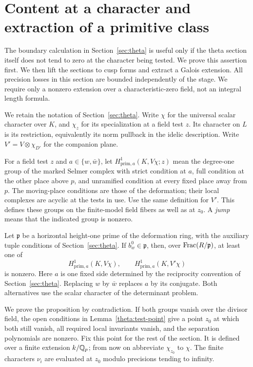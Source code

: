 \section{Content at a character and extraction of a primitive class}
\label{sec:extraction}

The boundary calculation in Section~\ref{sec:theta} is useful only if
the theta section itself does not tend to zero at the character being
tested.  We prove this assertion first.  We then lift the sections to
cusp forms and extract a Galois extension.  All precision losses in
this section are bounded independently of the stage.  We require only
a nonzero extension over a characteristic-zero field, not an integral
length formula.

We retain the notation of Section~\ref{sec:theta}.  Write $\chi$
for the universal scalar character over $K$, and $\chi_z$ for
its specialization at a field test $z$.  Its character on $L$
is its restriction, equivalently its norm pullback in the idelic
description.  Write $V'=V\otimes\chi_{D'}$ for the companion plane.

For a field test $z$ and $a\in\{w,\bar w\}$, let
$H^1_{\mathrm{prim},a}(K,V\chi;z)$ mean the degree-one group of the
marked Selmer complex with strict condition at $a$, full condition at
the other place above $p$, and unramified condition at every fixed
place away from $p$.  The moving-place conditions are those of the
deformation; their local complexes are acyclic at the tests in use.
Use the same definition for $V'$.  This defines these groups on the
finite-model field fibers as well as at $z_0$.  A \emph{jump} means
that the indicated group is nonzero.

\begin{proposition}
\label{extraction:theta-implication}
Let $\mathfrak p$ be a horizontal height-one prime of the deformation
ring, with the auxiliary tuple conditions of Section~\ref{sec:theta}.
If $b_w^0\in\mathfrak p$, then, over $\operatorname{Frac}(R/\mathfrak p)$,
at least one of
\[
 H^1_{\mathrm{prim},a}(K,V\chi),\qquad
 H^1_{\mathrm{prim},a}(K,V'\chi)
\]
is nonzero.  Here $a$ is one fixed side determined by the reciprocity
convention of Section~\ref{sec:theta}.  Replacing $w$ by $\bar w$
replaces $a$ by its conjugate.  Both alternatives use the scalar
character of the determinant problem.
\end{proposition}

We prove the proposition by contradiction.  If both groups vanish
over the divisor field, the open conditions in
Lemma~\ref{theta:test-point} give a point $z_0$ at which both still
vanish, all required local invariants vanish, and the separation
polynomials are nonzero.  Fix this point for the rest of the section.
It is defined over a finite extension $k/\mathbb Q_p$; from now on abbreviate
$\chi_{z_0}$ to $\chi$.  The finite characters $\nu_i$ are evaluated
at $z_0$ modulo precisions tending to infinity.

